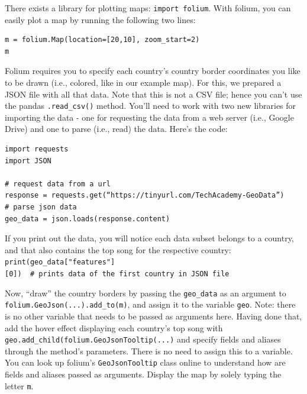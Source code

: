 \documentclass[
  11pt,
]{book}
\newenvironment{tipsp}[1]
  {
  \begin{itemize}
  \footnotesize
  \renewcommand{\labelitemi}{
    \raisebox{-.7\height}[0pt][0pt]{
      {\setkeys{Gin}{width=3em,keepaspectratio}
        \texttt{[image: images/\#1.png]}}
    }
  }
  \setlength{\fboxsep}{1em}
  \begin{pbox}
  \item
  }
  {
  \end{pbox}
  \end{itemize}
  }
\begin{document}
\begin{tipsp}p

There exists a library for plotting maps: \texttt{import\ folium}.
With folium, you can easily plot a map by running the following two lines:

\begin{verbatim}
m = folium.Map(location=[20,10], zoom_start=2)
m
\end{verbatim}

Folium requires you to specify each country's country border coordinates you like to be drawn (i.e., colored, like in our example map). For this, we prepared a JSON file with all that data. Note that this is not a CSV file; hence you can't use the pandas \texttt{.read\_csv()} method. You'll need to work with two new libraries for importing the data - one for requesting the data from a web server (i.e., Google Drive) and one to parse (i.e., read) the data. Here's the code:

\begin{verbatim}
import requests
import JSON

# request data from a url
response = requests.get(“https://tinyurl.com/TechAcademy-GeoData”)
# parse json data
geo_data = json.loads(response.content)
\end{verbatim}

If you print out the data, you will notice each data subset belongs to a country, and that also contains the top song for the respective country: \texttt{print(geo\_data{[}"features"{]}{[}0{]})\ \ \#\ prints\ data\ of\ the\ first\ country\ in\ JSON\ file}

Now, ``draw'' the country borders by passing the \texttt{geo\_data} as an argument to \texttt{folium.GeoJson(...).add\_to(m)}, and assign it to the variable \texttt{geo}. Note: there is no other variable that needs to be passed as arguments here.
Having done that, add the hover effect displaying each country's top song with \texttt{geo.add\_child(folium.GeoJsonTooltip(...)} and specify fields and aliases through the method's parameters. There is no need to assign this to a variable. You can look up folium's \texttt{GeoJsonTooltip} class online to understand how are fields and aliases passed as arguments.
Display the map by solely typing the letter \texttt{m}.

\end{tipsp}
\end{document}
